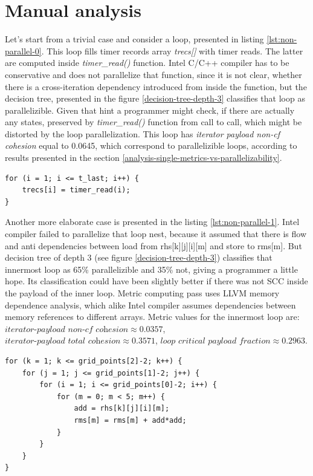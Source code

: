 \section{Manual analysis}
\label{analysis-manual-analysis}
\qquad Let's start from a trivial case and consider a loop, presented in listing \ref{lst:non-parallel-0}. This loop fills timer records array \textit{trecs[]} with timer reads. The latter are computed inside \textit{timer\_read()} function. Intel C/C++ compiler has to be conservative and does not parallelize that function, since it is not clear, whether there is a cross-iteration dependency introduced from inside the function, but the decision tree, presented in the figure \ref{decision-tree-depth-3} classifies that loop as parallelizible. Given that hint a programmer might check, if there are actually any states, preserved by \textit{timer\_read()} function from call to call, which might be distorted by the loop parallelization. This loop has \textit{iterator payload non-cf cohesion} equal to 0.0645, which correspond to parallelizible loops, according to results presented in the section \ref{analysis-single-metrics-vs-parallelizability}.              
\begin{lstlisting}[caption={Loop, which has not been parallelized by Intel C/C++ compiler, but does seem algorithmically parallelizible, given absense of cross-iteration dependencies introduced by the function call. }, captionpos=b, label=lst:non-parallel-0, float,floatplacement=H]
for (i = 1; i <= t_last; i++) {
	trecs[i] = timer_read(i);
}
\end{lstlisting}\newline
\null\qquad Another more elaborate case is presented in the listing \ref{lst:non-parallel-1}. Intel compiler failed to parallelize that loop nest, because it assumed that there is flow and anti dependencies between load from rhs[k][j][i][m] and store to rms[m]. But decision tree of depth 3 (see figure \ref{decision-tree-depth-3}) classifies that innermost loop as 65\% parallelizible and 35\% not, giving a programmer a little hope. Its classification could have been slightly better if there was not SCC inside the payload of the inner loop. Metric computing pass uses LLVM memory dependence analysis, which alike Intel compiler assumes dependencies between memory references to different arrays. Metric values for the innermost loop are: $\textit{iterator-payload non-cf cohesion}\approx 0.0357$, $\textit{iterator-payload total cohesion}\approx 0.3571$, $\textit{loop critical payload fraction}\approx 0.2963$.
\begin{lstlisting}[caption={\textit{SNU\_NAS/BT/src/error.c:84}. Loop, which has not been parallelized by Intel C/C++ compiler due to conservative anti and flow dependencies assumptions between references to rhs and rms. But these are different arrays and the loop actually computes reduction.}, captionpos=b, label=lst:non-parallel-1, float,floatplacement=H]
for (k = 1; k <= grid_points[2]-2; k++) {
	for (j = 1; j <= grid_points[1]-2; j++) {
		for (i = 1; i <= grid_points[0]-2; i++) {
			for (m = 0; m < 5; m++) {
				add = rhs[k][j][i][m];
				rms[m] = rms[m] + add*add;
			} 
		} 
	} 
}
\end{lstlisting}\newline
